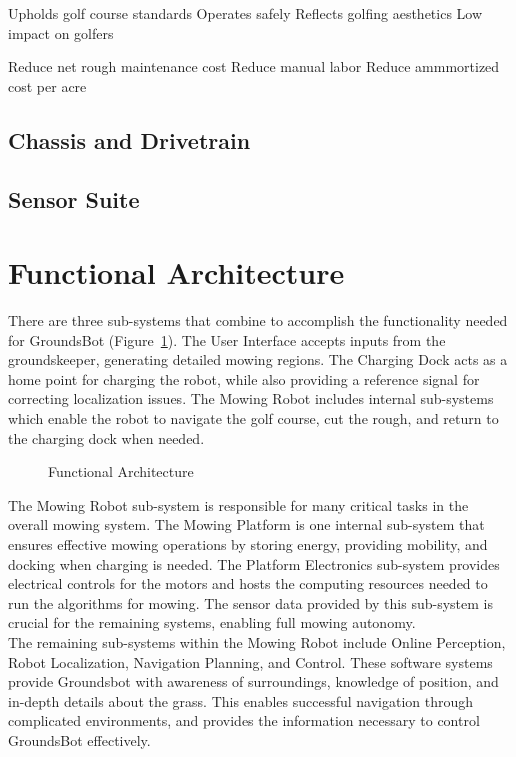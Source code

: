 \documentclass{article}
\begin{document}
Upholds golf course standards
  Operates safely 
  Reflects golfing aesthetics
  Low impact on golfers
  
Reduce net rough maintenance cost
  Reduce manual labor
  Reduce ammmortized cost per acre
  
\subsection{Chassis and Drivetrain}
\subsection{Sensor Suite}

\section{Functional Architecture}
  There are three sub-systems that combine to accomplish the functionality needed for GroundsBot (Figure~\ref{fig:functional}). The User Interface accepts inputs from the groundskeeper, generating detailed mowing regions. The Charging Dock acts as a home point for charging the robot, while also providing a reference signal for correcting localization issues. The Mowing Robot includes internal sub-systems which enable the robot to navigate the golf course, cut the rough, and return to the charging dock when needed.\\
  
\begin{figure}[H]
\centering
\def\svgwidth{\columnwidth}

\caption{Functional Architecture}
\label{fig:functional}
\end{figure}

  The Mowing Robot sub-system is responsible for many critical tasks in the overall mowing system. The Mowing Platform is one internal sub-system that ensures effective mowing operations by storing energy, providing mobility, and docking when charging is needed. The Platform Electronics sub-system provides electrical controls for the motors and hosts the computing resources needed to run the algorithms for mowing. The sensor data provided by this sub-system is crucial for the remaining systems, enabling full mowing autonomy.\\
  
  The remaining sub-systems within the Mowing Robot include Online Perception, Robot Localization, Navigation Planning, and Control. These software systems provide Groundsbot with awareness of surroundings, knowledge of position, and in-depth details about the grass. This enables successful navigation through complicated environments, and provides the information necessary to control GroundsBot effectively.\\
\end{document}
